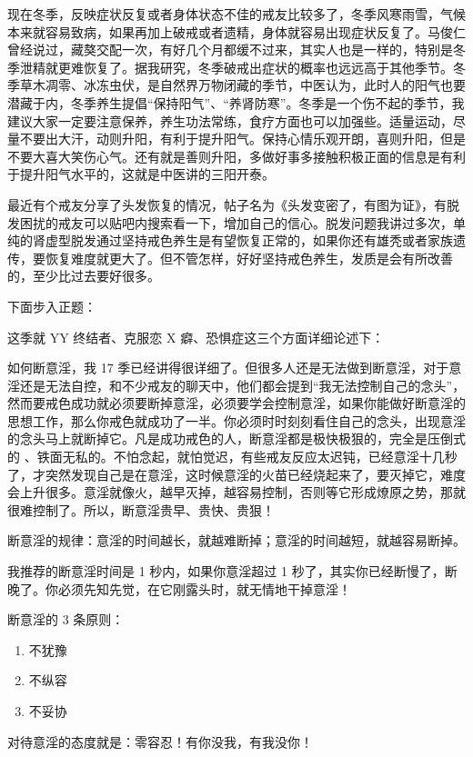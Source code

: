 \documentclass{ctexart}
\begin{document}
现在冬季，反映症状反复或者身体状态不佳的戒友比较多了，冬季风寒雨雪，气候本来就容易致病，如果再加上破戒或者遗精，身体就容易出现症状反复了。马俊仁曾经说过，藏獒交配一次，有好几个月都缓不过来，其实人也是一样的，特别是冬季泄精就更难恢复了。据我研究，冬季破戒出症状的概率也远远高于其他季节。冬季草木凋零、冰冻虫伏，是自然界万物闭藏的季节，中医认为，此时人的阳气也要潜藏于内，冬季养生提倡“保持阳气”、“养肾防寒”。冬季是一个伤不起的季节，我建议大家一定要注意保养，养生功法常练，食疗方面也可以加强些。适量运动，尽量不要出大汗，动则升阳，有利于提升阳气。保持心情乐观开朗，喜则升阳，但是不要大喜大笑伤心气。还有就是善则升阳，多做好事多接触积极正面的信息是有利于提升阳气水平的，这就是中医讲的三阳开泰。

最近有个戒友分享了头发恢复的情况，帖子名为《头发变密了，有图为证》，有脱发困扰的戒友可以贴吧内搜索看一下，增加自己的信心。脱发问题我讲过多次，单纯的肾虚型脱发通过坚持戒色养生是有望恢复正常的，如果你还有雄秃或者家族遗传，要恢复难度就更大了。但不管怎样，好好坚持戒色养生，发质是会有所改善的，至少比过去要好很多。

下面步入正题：

这季就 YY 终结者、克服恋 X 癖、恐惧症这三个方面详细论述下：

如何断意淫，我 17 季已经讲得很详细了。但很多人还是无法做到断意淫，对于意淫还是无法自控，和不少戒友的聊天中，他们都会提到“我无法控制自己的念头”，然而要戒色成功就必须要断掉意淫，必须要学会控制意淫，如果你能做好断意淫的思想工作，那么你戒色就成功了一半。你必须时时刻刻看住自己的念头，出现意淫的念头马上就断掉它。凡是成功戒色的人，断意淫都是极快极狠的，完全是压倒式的 、铁面无私的。不怕念起，就怕觉迟，有些戒友反应太迟钝，已经意淫十几秒了，才突然发现自己是在意淫，这时候意淫的火苗已经烧起来了，要灭掉它，难度会上升很多。意淫就像火，越早灭掉，越容易控制，否则等它形成燎原之势，那就很难控制了。所以，断意淫贵早、贵快、贵狠！

断意淫的规律：意淫的时间越长，就越难断掉；意淫的时间越短，就越容易断掉。

我推荐的断意淫时间是 1 秒内，如果你意淫超过 1 秒了，其实你已经断慢了，断晚了。你必须先知先觉，在它刚露头时，就无情地干掉意淫！

断意淫的 3 条原则：

\begin{enumerate}
    \item 不犹豫
    \item 不纵容
    \item 不妥协
\end{enumerate}

对待意淫的态度就是：零容忍！有你没我，有我没你！
\end{document}

